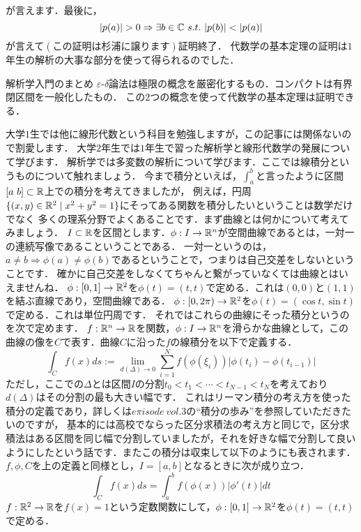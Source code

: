 が言えます．最後に，
\[
|p(a)|>0 \Rightarrow \exists b \in \C \ s.t. \ |p(b)| < |p(a)|
\]
が言えて$(この証明は杉浦に譲ります)$証明終了．
\proofx
代数学の基本定理の証明は$1$年生の解析の大事な部分を使って得られるのでした．
\begin{itembox}[l]{解析学入門のまとめ}
$\varepsilon$-$\delta$論法は極限の概念を厳密化するもの．コンパクトは有界閉区間を一般化したもの．
この$2$つの概念を使って代数学の基本定理は証明できる．
\end{itembox}
大学$1$生では他に線形代数という科目を勉強しますが，この記事には関係ないので割愛します．
大学$2$年生では$1$年生で習った解析学と線形代数学の発展について学びます．
解析学では多変数の解析について学びます．ここでは線積分というものについて触れましょう．
今まで積分といえば，$\int_a^b$と言ったように区間$[a\ b]\subset \mathbb R$上での積分を考えてきましたが，
例えば，円周$\{(x,y)\in\mathbb R^2 \mid x^2+y^2=1\}$にそってある関数を積分したいということは数学だけでなく
多くの理系分野でよくあることです．まず曲線とは何かについて考えてみましょう．
$I\subset\mathbb R$を区間とします．$\phi:I \to \mathbb R^n$が空間曲線であるとは，一対一の連続写像であるこということである．
一対一というのは，$a\neq b \Rightarrow \phi(a) \neq \phi(b)$であるということで，つまりは自己交差をしないということです．
確かに自己交差をしなくてちゃんと繋がっていなくては曲線とはいえませんね．
\ex
$\phi:[0,1] \to \mathbb R^2$を$\phi(t)=(t,t)$で定める．これは$(0,0)$と$(1,1)$を結ぶ直線であり，空間曲線である．
\exx
\ex
$\phi:[0,2\pi) \to \mathbb R^2$を$\phi(t)=(\cos t ,\sin t)$で定める．これは単位円周です．
\exx
それではこれらの曲線にそった積分というのを次で定めます．
$f:\mathbb R^n \to \mathbb R$を関数，$\phi:I\to\mathbb R^n$を滑らかな曲線として，この曲線の像を$C$で表す．曲線$C$に沿った$f$の線積分を以下で定義する．
\[
\int_C f(x)ds := \lim_{d(\Delta)\to 0} \sum_{i=1}^N f(\phi(\xi_i)) |\phi(t_i) - \phi(t_{i-1})|
\]
ただし，ここでの$\Delta$とは区間$I$の分割$t_0 < t_1 < \cdots < t_{N-1} < t_N$を考えており$d(\Delta)$はその分割の最も大きい幅です．
これはリーマン積分の考え方を使った積分の定義であり，詳しくは$e\pi isode\ vol.3$の``積分の歩み''を参照していただきたいのですが，
基本的には高校でならった区分求積法の考え方と同じで，区分求積法はある区間を同じ幅で分割していましたが，それを好きな幅で分割して良いようにしたという話です．またこの積分は収束して以下のようにも表されます．
\prop
$f,\phi,C$を上の定義と同様とし，$I=[a,b]$となるときに次が成り立つ．
\[
\int_C f(x) ds = \int_a^b f(\phi(x))|\phi'(t)|dt
\]
\propx
\ex
$f:\mathbb R^2\to\mathbb R$を$f(x)=1$という定数関数にして，$\phi:[0,1] \to \mathbb R^2$を$\phi(t)=(t,t)$で定める．\\
